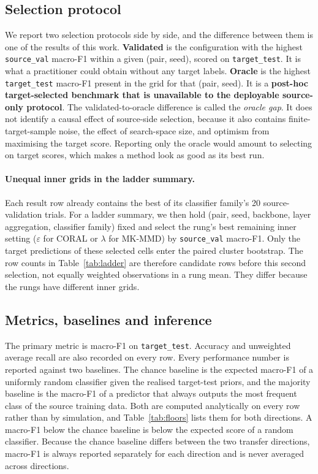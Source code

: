 \subsection{Selection protocol}
\label{sec:selection}

We report two selection protocols side by side, and the difference between
them is one of the results of this work. \textbf{Validated} is the
configuration with the highest \texttt{source\_val} macro-F1 within a given
(pair, seed), scored on \texttt{target\_test}. It is what a practitioner could
obtain without any target labels. \textbf{Oracle} is the highest
\texttt{target\_test} macro-F1 present in the grid for that (pair, seed). It is
a \textbf{post-hoc target-selected benchmark that is unavailable to the
deployable source-only protocol}. The validated-to-oracle difference is called
the \emph{oracle gap}. It does not identify a causal effect of source-side
selection, because it also contains finite-target-sample noise, the effect of
search-space size, and optimism from maximising the target score. Reporting
only the oracle would amount to selecting on target scores, which makes a
method look as good as its best run.

\paragraph{Unequal inner grids in the ladder summary.} Each result row already
contains the best of its classifier family's 20 source-validation trials. For a
ladder summary, we then hold (pair, seed, backbone, layer aggregation,
classifier family) fixed and select the rung's best remaining inner setting
($\varepsilon$ for CORAL or $\lambda$ for MK-MMD) by \texttt{source\_val}
macro-F1. Only the target predictions of these selected cells enter the paired
cluster bootstrap. The row counts in Table~\ref{tab:ladder} are therefore
candidate rows before this second selection, not equally weighted observations
in a rung mean. They differ because the rungs have different inner grids.

\subsection{Metrics, baselines and inference}
\label{sec:metrics}

The primary metric is macro-F1 on \texttt{target\_test}. Accuracy and
unweighted average recall are also recorded on every row. Every performance
number is reported against two baselines. The chance baseline is the expected
macro-F1 of a uniformly random classifier given the realised target-test
priors, and the majority baseline is the macro-F1 of a predictor that always
outputs the most frequent class of the source training data. Both are computed
analytically on every row rather than by
simulation, and Table~\ref{tab:floors} lists them for both directions. A
macro-F1 below the chance baseline is below the expected score of a random
classifier. Because the chance baseline differs between the two transfer
directions, macro-F1 is always reported separately for each direction and is
never averaged across directions.

